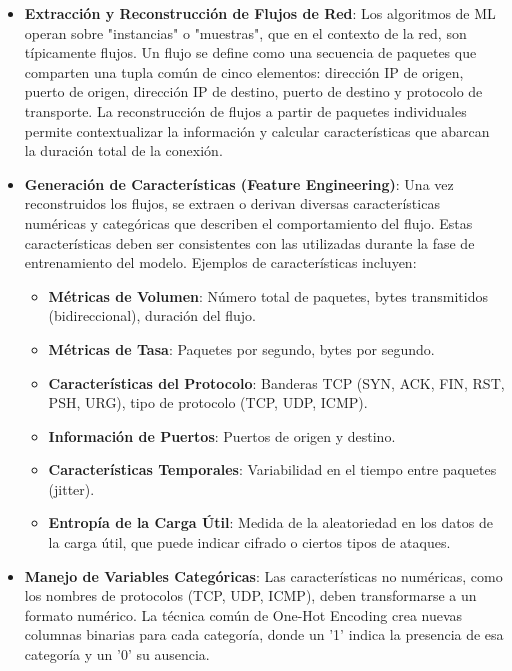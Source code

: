 \begin{itemize}
   
    \item\textbf{Extracción y Reconstrucción de Flujos de Red}: Los algoritmos de ML operan sobre "instancias" o "muestras", que en el contexto de la red, son típicamente flujos. Un flujo se define como una secuencia de paquetes que comparten una tupla común de cinco elementos: dirección IP de origen, puerto de origen, dirección IP de destino, puerto de destino y protocolo de transporte. La reconstrucción de flujos a partir de paquetes individuales permite contextualizar la información y calcular características que abarcan la duración total de la conexión.
    
     \item\textbf{Generación de Características (Feature Engineering)}: Una vez reconstruidos los flujos, se extraen o derivan diversas características numéricas y categóricas que describen el comportamiento del flujo. Estas características deben ser consistentes con las utilizadas durante la fase de entrenamiento del modelo. Ejemplos de características incluyen:
    \begin{itemize}
         \item\textbf{Métricas de Volumen}: Número total de paquetes, bytes transmitidos (bidireccional), duración del flujo.
        
         \item\textbf{Métricas de Tasa}: Paquetes por segundo, bytes por segundo.
        
         \item\textbf{Características del Protocolo}: Banderas TCP (SYN, ACK, FIN, RST, PSH, URG), tipo de protocolo (TCP, UDP, ICMP).
        
         \item\textbf{Información de Puertos}: Puertos de origen y destino.
        
         \item\textbf{Características Temporales}: Variabilidad en el tiempo entre paquetes (jitter).
        
         \item\textbf{Entropía de la Carga Útil}: Medida de la aleatoriedad en los datos de la carga útil, que puede indicar cifrado o ciertos tipos de ataques.
    \end{itemize}
    
     \item\textbf{Manejo de Variables Categóricas}: Las características no numéricas, como los nombres de protocolos (TCP, UDP, ICMP), deben transformarse a un formato numérico. La técnica común de One-Hot Encoding crea nuevas columnas binarias para cada categoría, donde un '1' indica la presencia de esa categoría y un '0' su ausencia.
    

\end{itemize}

